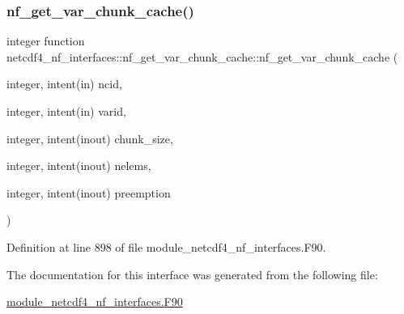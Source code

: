 \subsubsection{\texorpdfstring{nf\+\_\+get\+\_\+var\+\_\+chunk\+\_\+cache()}{nf\_get\_var\_chunk\_cache()}}
{\footnotesize\ttfamily integer function netcdf4\+\_\+nf\+\_\+interfaces\+::nf\+\_\+get\+\_\+var\+\_\+chunk\+\_\+cache\+::nf\+\_\+get\+\_\+var\+\_\+chunk\+\_\+cache (\begin{DoxyParamCaption}\item[{integer, intent(in)}]{ncid,  }\item[{integer, intent(in)}]{varid,  }\item[{integer, intent(inout)}]{chunk\+\_\+size,  }\item[{integer, intent(inout)}]{nelems,  }\item[{integer, intent(inout)}]{preemption }\end{DoxyParamCaption})}



Definition at line 898 of file module\+\_\+netcdf4\+\_\+nf\+\_\+interfaces.\+F90.



The documentation for this interface was generated from the following file\+:\begin{DoxyCompactItemize}
\item 
\hyperlink{module__netcdf4__nf__interfaces_8F90}{module\+\_\+netcdf4\+\_\+nf\+\_\+interfaces.\+F90}\end{DoxyCompactItemize}
